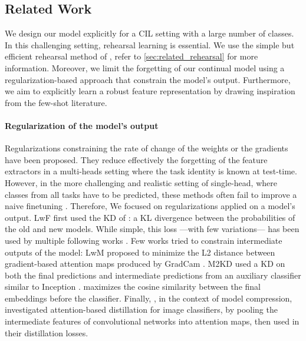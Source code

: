 \subsection{Related Work}
\label{sec:podnet_related}

We design our model explicitly for a \acf{CIL} setting with a large number of classes. In this
challenging setting, rehearsal learning is essential. We use the simple but efficient rehearsal
method of \citet{rebuffi2017icarl}, refer to \autoref{sec:related_rehearsal} for more information.
Moreover, we limit the forgetting of our continual model using a regularization-based approach that
constrain the model's output. Furthermore, we aim to explicitly learn a robust feature
representation by drawing inspiration from the few-shot literature.

\paragraph{Regularization of the model's output} Regularizations constraining the rate of change of
the weights \citep{kirkpatrick2017ewc} or the gradients \citep{farajtabar2020ogd} have been
proposed. They reduce effectively the forgetting of the feature extractors in a multi-heads setting
where the task identity is known at test-time. However, in the more challenging and realistic
setting of single-head, where classes from all tasks have to be predicted, these methods often fail
to improve a naive finetuning \citep{lesort2019regulshortcomings}. Therefore, We focused on
regularizations applied on a model's output. LwF \citep{li2018lwf} first used the \ac{KD} of
\citet{hinton2015knowledge_distillation}: a KL divergence between the probabilities of the old and
new models. While simple, this loss ---with few variations--- has been used by multiple following
works \citep{rebuffi2017icarl,zhao2020weightalignement}. Few works tried to constrain intermediate
outputs of the model: LwM \citep{dhar2019learning_without_memorizing_gradcam} proposed to minimize
the L2 distance between gradient-based attention maps produced by GradCam
\citep{selvaraju2017gradcam}. M2KD \citep{peng2019m2kd} used a \ac{KD} on both the final predictions
and intermediate predictions from an auxiliary classifier similar to Inception
\citep{szegedy2015inception}. \citet{hou2019ucir} maximizes the cosine similarity between the final
embeddings before the classifier. Finally, \citet{zagoruyko2016distillation_attention}, in the
context of model compression, investigated attention-based distillation for image classifiers, by
pooling the intermediate features of convolutional networks into attention maps, then used in their
distillation losses.

